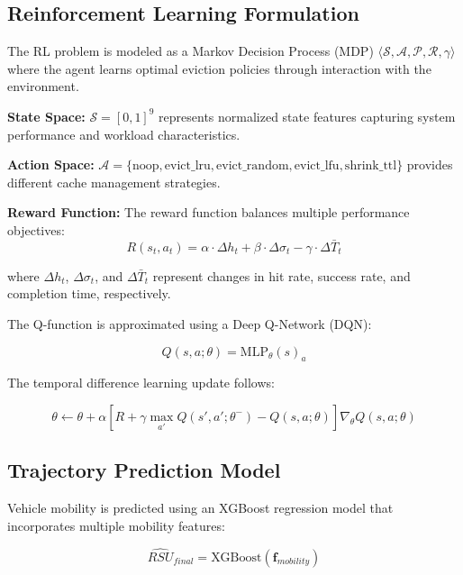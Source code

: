 \documentclass[11pt]{article}
\begin{document}
\subsection{Reinforcement Learning Formulation}

The RL problem is modeled as a Markov Decision Process (MDP) $\langle \mathcal{S}, \mathcal{A}, \mathcal{P}, \mathcal{R}, \gamma \rangle$ where the agent learns optimal eviction policies through interaction with the environment.

\textbf{State Space:} $\mathcal{S} = [0,1]^9$ represents normalized state features capturing system performance and workload characteristics.

\textbf{Action Space:} $\mathcal{A} = \{\text{noop}, \text{evict\_lru}, \text{evict\_random}, \text{evict\_lfu}, \text{shrink\_ttl}\}$ provides different cache management strategies.

\textbf{Reward Function:} The reward function balances multiple performance objectives:
\begin{equation}
R(s_t, a_t) = \alpha \cdot \Delta h_t + \beta \cdot \Delta \sigma_t - \gamma \cdot \Delta \bar{T}_t
\end{equation}

where $\Delta h_t$, $\Delta \sigma_t$, and $\Delta \bar{T}_t$ represent changes in hit rate, success rate, and completion time, respectively.

The Q-function is approximated using a Deep Q-Network (DQN):

\begin{equation}
Q(s,a;\theta) = \text{MLP}_{\theta}(s)_a
\end{equation}

The temporal difference learning update follows:

\begin{equation}
\theta \leftarrow \theta + \alpha \left[ R + \gamma \max_{a'} Q(s',a';\theta^-) - Q(s,a;\theta) \right] \nabla_{\theta} Q(s,a;\theta)
\end{equation}

\subsection{Trajectory Prediction Model}

Vehicle mobility is predicted using an XGBoost regression model that incorporates multiple mobility features:

\begin{equation}
\hat{RSU}_{final} = \text{XGBoost}(\mathbf{f}_{mobility})
\end{equation}
\end{document}
